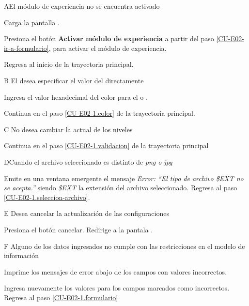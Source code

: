 \begin{UCtrayectoriaA}{A}{El módulo de experiencia no se encuentra activado}

  \Sistema Carga la pantalla .

  \Actor Presiona el botón {\bf Activar módulo de experiencia}
   a partir del paso \ref{CU-E02-ir-a-formulario},
                     para activar el módulo de experiencia.

  \Sistema Regresa al inicio de la trayectoria principal.

\end{UCtrayectoriaA}

\begin{UCtrayectoriaA}{B}{%
El  desea especificar el valor del 
directamente}

    \Actor Ingresa el valor hexadecimal del color para el
            o
           .

    \Sistema Continua en el paso \ref{CU-E02-1.color} de la trayectoria principal.

\end{UCtrayectoriaA}

\begin{UCtrayectoriaA}{C}{%
No desea cambiar la  actual de los niveles}

    \Sistema Continua en el paso \ref{CU-E02-1.validacion} de la trayectoria principal
\end{UCtrayectoriaA}

\begin{UCtrayectoriaA}{D}{Cuando el archivo seleccionado es distinto de {\it png o jpg}}

  \Sistema Emite en una ventana emergente el mensaje {\it Error: ``El tipo de
           archivo \$EXT no se acepta.''} siendo {\it\$EXT} la extensión del
           archivo seleccionado.
  \Sistema Regresa al paso \ref{CU-E02-1.seleccion-archivo}.

\end{UCtrayectoriaA}

\begin{UCtrayectoriaA}{E}{%
Desea cancelar la actualización de las configuraciones}

  \Actor Presiona el botón cancelar.
  \Sistema Redirige a la pantala .

\end{UCtrayectoriaA}

\begin{UCtrayectoriaA}{F}{%
Alguno de los datos ingresados no cumple con las restricciones en el modelo de
información}

    \Sistema Imprime los mensajes de error abajo de los campos con valores incorrectos.

    \Actor Ingresa nuevamente los valores para los campos marcados como incorrectos.
    \Sistema Regresa al paso \ref{CU-E02-1.formulario}

\end{UCtrayectoriaA}

